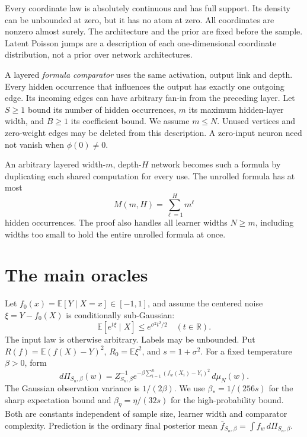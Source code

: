 \documentclass[11pt]{article}
\theoremstyle{remark}\newtheorem{remark}[theorem]{Remark}
\newcommand{\E}{\mathbb E}\newcommand{\R}{\mathbb R}\newcommand{\Pp}{\mathbb P}
\begin{document}
Every coordinate law is absolutely continuous and has full support. Its density can be unbounded at zero, but it has no atom at zero. All coordinates are nonzero almost surely. The architecture and the prior are fixed before the sample. Latent Poisson jumps are a description of each one-dimensional coordinate distribution, not a prior over network architectures.

A layered \emph{formula comparator} uses the same activation, output link and depth. Every hidden occurrence that influences the output has exactly one outgoing edge. Its incoming edges can have arbitrary fan-in from the preceding layer. Let $S\ge1$ bound its number of hidden occurrences, $m$ its maximum hidden-layer width, and $B\ge1$ its coefficient bound. We assume $m\le N$. Unused vertices and zero-weight edges may be deleted from this description. A zero-input neuron need not vanish when $\phi(0)\ne0$.

An arbitrary layered width-$m$, depth-$H$ network becomes such a formula by duplicating each shared computation for every use. The unrolled formula has at most
\begin{equation}
 M(m,H)=\sum_{\ell=1}^H m^\ell
 \label{eq:formula-size}
\end{equation}
hidden occurrences. The proof also handles all learner widths $N\ge m$, including widths too small to hold the entire unrolled formula at once.

\section{The main oracles}
Let $f_0(x)=\E[Y\mid X=x]\in[-1,1]$, and assume the centered noise
$\xi=Y-f_0(X)$ is conditionally sub-Gaussian:
\[
 \E[e^{t\xi}\mid X]\le e^{\sigma^2t^2/2}\quad(t\in\R).
\]
The input law is otherwise arbitrary. Labels may be unbounded. Put
$R(f)=\E(f(X)-Y)^2$, $R_0=\E\xi^2$, and $s=1+\sigma^2$.
For a fixed temperature $\beta>0$, form
\begin{equation}
 d\Pi_{S_n,\beta}(w)=Z_{S_n,\beta}^{-1}
       e^{-\beta\sum_{i=1}^n(f_w(X_i)-Y_i)^2}\,d\mu_N(w).
 \label{eq:posterior}
\end{equation}
The Gaussian observation variance is $1/(2\beta)$. We use $\beta_*=1/(256s)$ for the sharp expectation bound and $\beta_\eta=\eta/(32s)$ for the high-probability bound. Both are constants independent of sample size, learner width and comparator complexity. Prediction is the ordinary final posterior mean
$\bar f_{S_n,\beta}=\int f_w\,d\Pi_{S_n,\beta}$.
\end{document}
